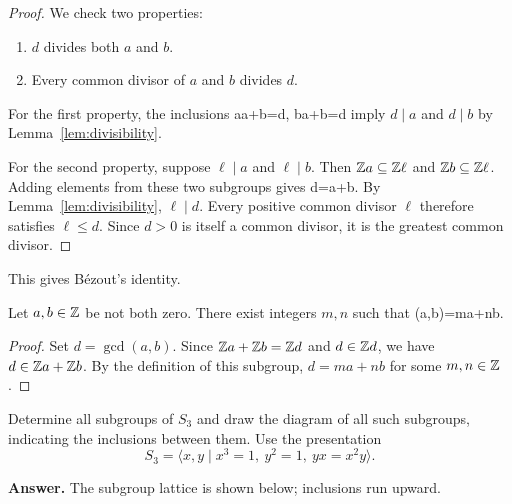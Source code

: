 \documentclass[reqno,11pt]{amsart}
\begin{document}
\begin{proof}
	We check two properties:
	\begin{enumerate}[label=\textbf{(\arabic*)}]
		\item $d$ divides both $a$ and $b$.
		\item Every common divisor of $a$ and $b$ divides $d$.
	\end{enumerate}
	For the first property, the inclusions
	\be
	\Z a\subseteq\Z a+\Z b=\Z d,
	\qquad
	\Z b\subseteq\Z a+\Z b=\Z d
	\ee
	imply $d\mid a$ and $d\mid b$ by Lemma~\ref{lem:divisibility}.

	For the second property, suppose $\ell\mid a$ and $\ell\mid b$.
	Then $\mathbb{Z} a\subseteq\mathbb{Z}\ell$ and $\mathbb{Z} b\subseteq\mathbb{Z}\ell$. Adding elements
	from these two subgroups gives
	\be
	\Z d=\Z a+\Z b\subseteq\Z\ell.
	\ee
	By Lemma~\ref{lem:divisibility}, $\ell\mid d$.
	Every positive common divisor $\ell$ therefore satisfies $\ell\leq d$.
	Since $d>0$ is itself a common divisor, it is the greatest common divisor.
\end{proof}

This gives B\'ezout's identity.

\begin{corollary}
	Let $a,b\in\mathbb{Z}$ be not both zero. There exist integers $m,n$ such that
	\be
	\gcd(a,b)=ma+nb.
	\ee
\end{corollary}

\begin{proof}
	Set $d=\gcd(a,b)$. Since $\mathbb{Z} a+\mathbb{Z} b=\mathbb{Z} d$ and $d\in\mathbb{Z} d$, we have
	$d\in\mathbb{Z} a+\mathbb{Z} b$. By the definition of this subgroup, $d=ma+nb$ for some
	$m,n\in\mathbb{Z}$.
\end{proof}

\begin{exercise}[Subgroups of $S_3$]
Determine all subgroups of $S_3$ and draw the diagram of all such subgroups,
indicating the inclusions between them. Use the presentation
\[
  S_3=\langle x,y\mid x^3=1,\ y^2=1,\ yx=x^2y\rangle.
\]

\noindent\textbf{Answer.} The subgroup lattice is shown below; inclusions run upward.
\begin{center}
\end{center}

\end{exercise}
\end{document}
